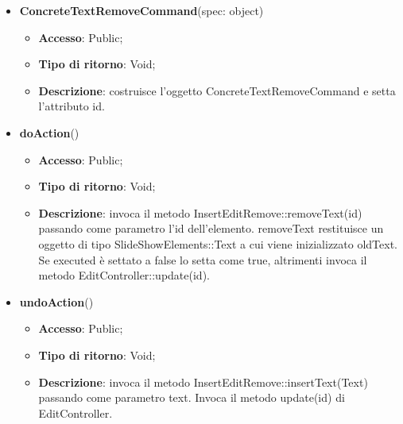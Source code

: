 {{{	
	\begin{itemize}
		\item \textbf{ConcreteTextRemoveCommand}(spec: object)
		\begin{itemize}
			\item \textbf{Accesso}: Public;
			\item \textbf{Tipo di ritorno}: Void;
			\item \textbf{Descrizione}: costruisce l’oggetto ConcreteTextRemoveCommand e setta l’attributo id.
		\end{itemize}
		\item \textbf{doAction}()
		\begin{itemize}
			\item \textbf{Accesso}: Public;
			\item \textbf{Tipo di ritorno}: Void;
			\item \textbf{Descrizione}: invoca il metodo InsertEditRemove::removeText(id) passando come parametro l’id dell’elemento. removeText restituisce un oggetto di tipo SlideShowElements::Text a cui viene inizializzato oldText. Se executed è settato a false lo setta come true, altrimenti invoca il metodo EditController::update(id).
		\end{itemize}
		\item \textbf{undoAction}()
		\begin{itemize}
			\item \textbf{Accesso}: Public;
			\item \textbf{Tipo di ritorno}: Void;
			\item \textbf{Descrizione}: invoca il metodo InsertEditRemove::insertText(Text) passando come parametro text. Invoca il metodo update(id) di EditController.
		\end{itemize}
	\end{itemize}
	}
}}
